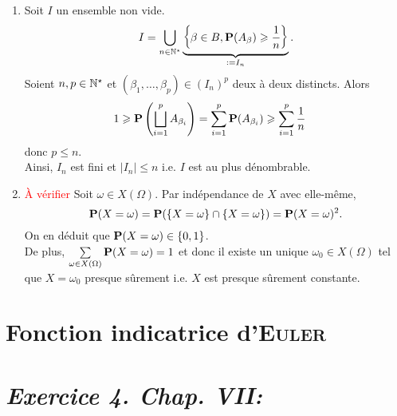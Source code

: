 \begin{solution}
\begin{enumerate}
    \item Soit $I$ un ensemble non vide. 
    $$I = \bigcup_{n \in \Ne} \underbrace{\left \{ \beta \in B, \P(A_\beta) \geqslant \frac{1}{n} \right \}}_{\defeq I_n}.$$
    Soient $n, p \in \Ne$ et $(\beta_1, \dots, \beta_p) \in (I_n)^p$ deux à deux distincts. Alors
    \begin{align*}
        1 \geqslant \P \left( \bigsqcup_{i=1}^p A_{\beta_i} \right) &= \sum_{i=1}^p \P(A_{\beta_i}) \geqslant \sum_{i=1}^p \frac{1}{n}
    \end{align*}
    donc $p \leqslant n$. \\
    Ainsi, $I_n$ est fini et $|I_n| \leqslant n$ i.e. $I$ est au plus dénombrable. 
    \item \textcolor{red}{À vérifier} Soit $\omega \in X(\Omega)$. Par indépendance de $X$ avec elle-même,
    $$\P(X = \omega) = \P(\{X=\omega\} \cap \{X=\omega\})= \P(X=\omega)^2.$$
    On en déduit que $\P(X=\omega) \in \{ 0, 1 \}$. \\
    De plus, $\sum\limits_{\omega \in X(\Omega)} \P(X=\omega) = 1$ et donc il existe un unique $\omega_0 \in X(\Omega)$ tel que $X=\omega_0$ presque sûrement i.e. $X$ est presque sûrement constante. 
\end{enumerate}
\end{solution}

\section{Fonction indicatrice d'\textsc{Euler}}


\section{\emph{Exercice 4. Chap. VII:}}
